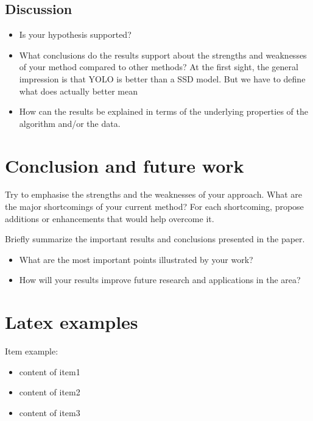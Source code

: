 \documentclass[runningheads,a4paper,11pt]{report}
\begin{document}
\section{Discussion}
\label{section:discussion}

\begin{itemize}
	\item Is your hypothesis supported? 
	\item What conclusions do the results support about the strengths and weaknesses of your method compared to other methods? 
	At the first sight, the general impression is that YOLO is better than a SSD model. But we have to define what does actually better mean 
	\item How can the results be explained in terms of the underlying properties of the algorithm and/or the data. 
\end{itemize}


\chapter{Conclusion and future work}
\label{chapter:concl}

Try to emphasise the strengths and the weaknesses of your approach.
What are the major shortcomings of your current method? For each shortcoming, propose additions or enhancements that would help overcome it. 

Briefly summarize the important results and conclusions presented in the paper. 

\begin{itemize}
	\item What are the most important points illustrated by your work? 
	\item How will your results improve future research and applications in the area? 
\end{itemize}


\chapter{Latex examples}

Item example: 

\begin{itemize}
	\item content of item1
 	\item content of item2
 	\item content of item3
\end{itemize}
\end{document}

